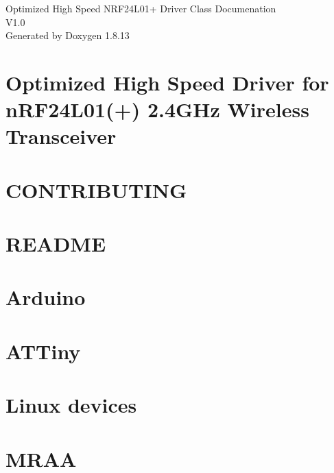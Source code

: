 \documentclass[twoside]{book}
\newcommand{\+}{\discretionary{\mbox{\scriptsize$\hookleftarrow$}}{}{}}
\newcommand{\clearemptydoublepage}{%
  \newpage{\pagestyle{empty}\cleardoublepage}%
}
\begin{document}
\hypersetup{pageanchor=false,
             bookmarksnumbered=true,
             pdfencoding=unicode
            }
\begin{titlepage}
\vspace*{7cm}
\begin{center}%
{\Large Optimized High Speed N\+R\+F24\+L01+ Driver Class Documenation \\[1ex]\large V1.\+0 }\\
\vspace*{1cm}
{\large Generated by Doxygen 1.8.13}\\
\end{center}
\end{titlepage}
\clearemptydoublepage
{}
\tableofcontents
\clearemptydoublepage
{}
\hypersetup{pageanchor=true}

\chapter{Optimized High Speed Driver for n\+R\+F24\+L01(+) 2.4\+G\+Hz Wireless Transceiver}
\label{index}\hypertarget{index}{}
\chapter{C\+O\+N\+T\+R\+I\+B\+U\+T\+I\+NG}
\label{md_CONTRIBUTING}

\chapter{R\+E\+A\+D\+ME}
\label{md_README}

\chapter{Arduino}
\label{Arduino}

\chapter{A\+T\+Tiny}
\label{ATTiny}

\chapter{Linux devices}
\label{Linux}

\chapter{M\+R\+AA}
\label{MRAA}

\end{document}
